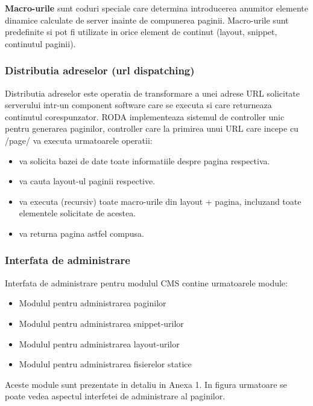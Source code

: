 \documentclass[a4paper, 10pt]{article}
\begin{document}
{\bigskip

\textbf{Macro-urile} sunt coduri speciale care determina introducerea anumitor elemente dinamice calculate de server inainte de compunerea paginii. Macro-urile sunt predefinite si pot fi utilizate in orice element de continut (layout, snippet, continutul paginii). 

\bigskip


\subsubsection*{Distributia adreselor (url dispatching)}


Distributia adreselor este operatia de transformare a unei adrese URL solicitate serverului intr-un component software care se executa si care returneaza continutul corespunzator. RODA implementeaza sistemul de controller unic pentru generarea paginilor, controller care la primirea unui URL care incepe cu /page/ va executa urmatoarele operatii:

\begin{itemize}
\item
va solicita bazei de date toate informatiile despre pagina respectiva. 
\item
va cauta layout-ul paginii respective.
\item
va executa (recursiv) toate macro-urile din layout + pagina, incluzand toate elementele solicitate de acestea.
\item
va returna pagina astfel compusa. 
\end{itemize}

\subsubsection*{Interfata de administrare}

Interfata de administrare pentru modulul CMS contine urmatoarele module:
\begin{itemize}
\item
Modulul pentru administrarea paginilor
\item
Modulul pentru administrarea snippet-urilor
\item
Modulul pentru administrarea layout-urilor
\item
Modulul pentru administrarea fisierelor statice
\end{itemize}

\bigskip

Aceste module sunt prezentate in detaliu in Anexa 1. In figura urmatoare se poate vedea aspectul interfetei de administrare al paginilor.

}
\end{document}
